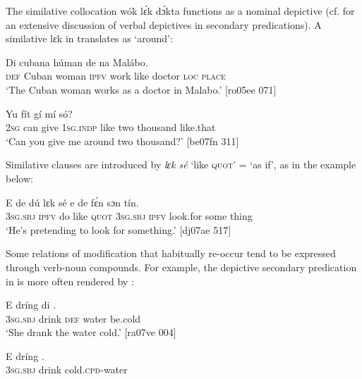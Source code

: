 The similative collocation wók lɛ́k dɔ́kta functions as a nominal depictive  (cf.  for an extensive discussion of verbal depictives in secondary predications). A similative lɛk in  translates as ‘around’: 


\ea%
    \label{ex:key:888}
    \gll Di  cubana  húman  de          na  Malábo.\\
\textsc{def}  Cuban  woman  \textsc{ipfv}  work  like  doctor  \textsc{loc}  \textsc{place}\\

\glt ‘The Cuban woman works as a doctor in Malabo.’ [ro05ee 071]
\z


\ea%
    \label{ex:key:889}
    \gll Yu  fít  gí  mí              só?\\
\textsc{2sg}  can  give  \textsc{1sg.indp}  like  two  thousand  like.that\\

\glt ‘Can you give me around two thousand?’ [be07fn 311]
\z

Similative clauses are introduced by \textit{lɛk sé} ‘like \textsc{quot}’ = ‘as if’, as in the example below:


\ea%
    \label{ex:key:890}
    \gll E    de  dú  lɛk  sé  e    de    fɛ́n    sɔn    tín.\\
\textsc{3sg.sbj}  \textsc{ipfv}  do  like  \textsc{quot}  \textsc{3sg.sbj}  \textsc{ipfv}    look.for  some  thing\\

\glt ‘He’s pretending to look for something.’ [dj07ae 517]
\z

Some relations of modification that habitually re-occur tend to be expressed through verb-noun compounds. For example, the depictive secondary predication in  is more often rendered by :


\ea%
    \label{ex:key:891}
    \gll E    dríng  di    .\\
\textsc{3sg.sbj}  drink  \textsc{def}  water  be.cold\\

\glt ‘She drank the water cold.’ [ra07ve 004]
\z


\ea%
    \label{ex:key:892}
    \gll E    dríng  .\\
\textsc{3sg.sbj}  drink  cold.\textsc{cpd}{}-water\\

